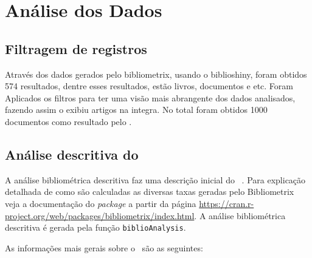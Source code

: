 \section{Análise dos Dados}

\subsection{Filtragem de registros}

Através dos dados gerados pelo bibliometrix, usando o biblioshiny, foram obtidos 574 resultados, dentre esses resultados, estão livros, documentos e etc. Foram Aplicados os filtros para ter uma visão mais abrangente dos dados analisados, fazendo assim o \dataset exibiu artigos na integra. No total foram obtidos 1000 documentos como resultado pelo \dataset.

\subsection{Análise descritiva do \dataset }

A análise bibliométrica descritiva faz uma descrição inicial do \dataset\  . Para explicação detalhada de como são calculadas as diversas taxas geradas pelo Bibliometrix veja a documentação do \textit{package} a partir da página \url{https://cran.r-project.org/web/packages/bibliometrix/index.html}. A análise bibliométrica descritiva é gerada pela função \texttt{biblioAnalysis}.

As informações mais gerais sobre o \dataset\ são as seguintes:


